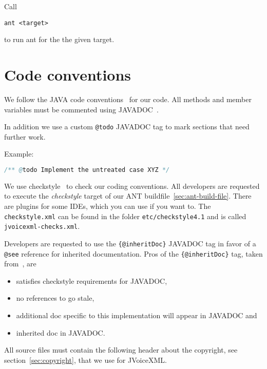 \documentclass[11pt,a4paper]{article}
\begin{document}
Call
\begin{lstlisting}
ant <target>
\end{lstlisting}
to run ant for the the given target.

\section{Code conventions}
\label{sec:code-conventions}

We follow the JAVA code conventions~\cite{sun:codeconv} for our code. All
methods and member variables must be commented using 
JAVADOC~\cite{sun:javadoc_guidelines}.

In addition we use a custom \texttt{@todo} JAVADOC tag to mark
sections that need further work.

Example:

\begin{lstlisting}[language=Java]
/** @todo Implement the untreated case XYZ */
\end{lstlisting}

We use checkstyle~\cite{checkstyle} to check our coding conventions.
All developers are requested to execute the \emph{checkstyle} target
of our ANT buildfile~\ref{sec:ant-build-file}. 
There are plugins for some IDEs, which you can use if you want to. The
\texttt{checkstyle.xml} can be found in the folder 
\texttt{etc/checkstyle4.1} and is called \texttt{jvoicexml-checks.xml}.

Developers are requested to use the \texttt{\{@inheritDoc\}} JAVADOC
tag in favor of a \texttt{@see} reference for inherited documentation.
Pros of the \texttt{\{@inhe\-rit\-Doc\}} tag, taken 
from~\cite{tauber:inheritdoc}, are
\begin{itemize}
\item satisfies checkstyle requirements for JAVADOC,
\item no references to go stale,
\item additional doc specific to this implementation will appear in JAVADOC and
\item inherited doc in JAVADOC.
\end{itemize}

All source files must contain the following header about the 
copyright, see section~\ref{sec:copyright}, that we use for JVoiceXML.
\end{document}
